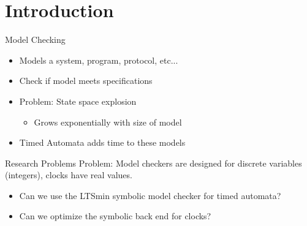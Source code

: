 
\section{Introduction}

\begin{frame}{Model Checking}
\begin{itemize}
	
	\item {\large  Models a system, program, protocol, etc...}
	\item {\large  Check if model meets specifications}
	\item {\large  Problem: State space explosion}
	\begin{itemize}
		\item {\large Grows exponentially with size of model}
	\end{itemize}
	\item {\large Timed Automata adds time to these models}
\end{itemize}
\end{frame}

\begin{frame}{Research Problems}
Problem: Model checkers are designed for discrete variables (integers), clocks have real values.
\begin{itemize}
\item Can we use the LTSmin symbolic model checker for timed automata?
\item Can we optimize the symbolic back end for clocks?
\end{itemize}
\end{frame}


